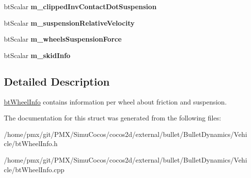 \begin{DoxyCompactItemize}
bt\+Scalar {\bfseries m\+\_\+clipped\+Inv\+Contact\+Dot\+Suspension}
\item 
\mbox{\label{structbtWheelInfo_ab370ba1508dd6c40425fb5b8d4fb4cc4}} 
bt\+Scalar {\bfseries m\+\_\+suspension\+Relative\+Velocity}
\item 
\mbox{\label{structbtWheelInfo_a892ec97b81ecc90e4884439aa22815f7}} 
bt\+Scalar {\bfseries m\+\_\+wheels\+Suspension\+Force}
\item 
\mbox{\label{structbtWheelInfo_a2b4991f5aa8d8f07c64c98c2f6e67baf}} 
bt\+Scalar {\bfseries m\+\_\+skid\+Info}
\end{DoxyCompactItemize}


\subsection{Detailed Description}
\hyperlink{structbtWheelInfo}{bt\+Wheel\+Info} contains information per wheel about friction and suspension. 

The documentation for this struct was generated from the following files\+:\begin{DoxyCompactItemize}
\item 
/home/pmx/git/\+P\+M\+X/\+Simu\+Cocos/cocos2d/external/bullet/\+Bullet\+Dynamics/\+Vehicle/bt\+Wheel\+Info.\+h\item 
/home/pmx/git/\+P\+M\+X/\+Simu\+Cocos/cocos2d/external/bullet/\+Bullet\+Dynamics/\+Vehicle/bt\+Wheel\+Info.\+cpp\end{DoxyCompactItemize}

